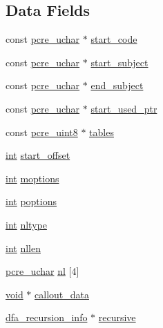 \subsection*{Data Fields}
\begin{DoxyCompactItemize}
\item 
const \hyperlink{pcre__internal_8h_a9d8efd0ad5b191db2a1793268600deb9}{pcre\+\_\+uchar} $\ast$ \hyperlink{structdfa__match__data_a6f03bc5b579c563093a88c8a5cb92211}{start\+\_\+code}
\item 
const \hyperlink{pcre__internal_8h_a9d8efd0ad5b191db2a1793268600deb9}{pcre\+\_\+uchar} $\ast$ \hyperlink{structdfa__match__data_a913b4a197ede6daa315552a852219f48}{start\+\_\+subject}
\item 
const \hyperlink{pcre__internal_8h_a9d8efd0ad5b191db2a1793268600deb9}{pcre\+\_\+uchar} $\ast$ \hyperlink{structdfa__match__data_a1b197dff55a95ad48dc3753745d40e0b}{end\+\_\+subject}
\item 
const \hyperlink{pcre__internal_8h_a9d8efd0ad5b191db2a1793268600deb9}{pcre\+\_\+uchar} $\ast$ \hyperlink{structdfa__match__data_ad33a2bafb99408460ead8f4571d36391}{start\+\_\+used\+\_\+ptr}
\item 
const \hyperlink{pcre__internal_8h_a6e9105ffeed09883190f9bf30d93e210}{pcre\+\_\+uint8} $\ast$ \hyperlink{structdfa__match__data_a41a371c2cc917e05962d34a152a6304c}{tables}
\item 
\hyperlink{pcre_8txt_a42dfa4ff673c82d8efe7144098fbc198}{int} \hyperlink{structdfa__match__data_a62e37bf7f1ae88322f1af0c99ef7f0b2}{start\+\_\+offset}
\item 
\hyperlink{pcre_8txt_a42dfa4ff673c82d8efe7144098fbc198}{int} \hyperlink{structdfa__match__data_a717b432620e3482e13f8c78744a0b4a8}{moptions}
\item 
\hyperlink{pcre_8txt_a42dfa4ff673c82d8efe7144098fbc198}{int} \hyperlink{structdfa__match__data_a8cc21740bab8d5517e835c700a7096dd}{poptions}
\item 
\hyperlink{pcre_8txt_a42dfa4ff673c82d8efe7144098fbc198}{int} \hyperlink{structdfa__match__data_a93d96bd98994349fe072ee49ed708b1f}{nltype}
\item 
\hyperlink{pcre_8txt_a42dfa4ff673c82d8efe7144098fbc198}{int} \hyperlink{structdfa__match__data_a261c72534896954bee60296d9384733a}{nllen}
\item 
\hyperlink{pcre__internal_8h_a9d8efd0ad5b191db2a1793268600deb9}{pcre\+\_\+uchar} \hyperlink{structdfa__match__data_a33c68961f4b0b4f16e9c7482a5a6db65}{nl} \mbox{[}4\mbox{]}
\item 
\hyperlink{group__MOD__ISAPI_gacd6cdbf73df3d9eed42fa493d9b621a6}{void} $\ast$ \hyperlink{structdfa__match__data_a2add77eaca1d1c46cb999ebc7df73a68}{callout\+\_\+data}
\item 
\hyperlink{structdfa__recursion__info}{dfa\+\_\+recursion\+\_\+info} $\ast$ \hyperlink{structdfa__match__data_a0352f034dde59382a0e841aeda2b6799}{recursive}
\end{DoxyCompactItemize}


